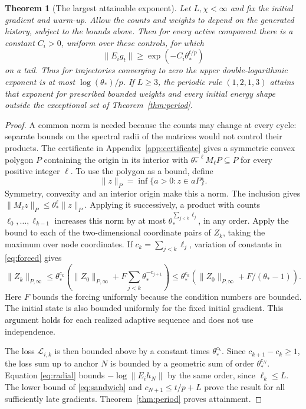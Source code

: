 \documentclass[11pt,a4paper]{article}
\newtheorem{theorem}{Theorem}
\numberwithin{equation}{section}
\newcommand{\norm}[1]{\lVert#1\rVert}
\begin{document}
\begin{theorem}[The largest attainable exponent]\label{thm:ceiling}
Let \(L,\chi<\infty\) and fix the initial gradient and warm-up. Allow the counts and weights to depend on the generated history, subject to the bounds above. Then for every active component there is a constant \(C_i>0\), uniform over these controls, for which
\[
 \norm{E_i g_t}\ge \exp(-C_i\theta_*^{t/p})
\]
on a tail. Thus for trajectories converging to zero the upper double-logarithmic exponent is at most \(\log(\theta_*)/p\). If \(L\ge3\), the periodic rule \((1,2,1,3)\) attains that exponent for prescribed bounded weights and every initial energy shape outside the exceptional set of Theorem~\ref{thm:period}.
\end{theorem}

\begin{proof}
A common norm is needed because the counts may change at every
cycle: separate bounds on the spectral radii of the matrices would
not control their products. The certificate in
Appendix~\ref{app:certificate} gives a symmetric convex polygon \(P\) containing the origin in its interior with \(\theta_*^{-\ell}M_\ell P\subseteq P\) for every positive integer \(\ell\). To use the polygon as a bound, define
\[
 \norm z_P=\inf\{a>0:z\in aP\}.
\]
Symmetry, convexity and an interior origin make this a norm. The inclusion gives \(\norm{M_\ell z}_P\le\theta_*^\ell\norm z_P\). Applying it successively, a product with counts \(\ell_0,\ldots,\ell_{k-1}\) increases this norm by at most \(\theta_*^{\sum_{j<k}\ell_j}\), in any order. Apply the bound to each of the two-dimensional coordinate pairs of \(Z_k\), taking the maximum over node coordinates. If \(c_k=\sum_{j<k}\ell_j\), variation of constants in \eqref{eq:forced} gives
\[
 \norm{Z_k}_{P,\infty}
 \le \theta_*^{c_k}\!\left(\norm{Z_0}_{P,\infty}
               + F\sum_{j<k}\theta_*^{-c_{j+1}}\right)
 \le \theta_*^{c_k}\!\left(\norm{Z_0}_{P,\infty}+F/(\theta_*-1)\right).
\]
Here \(F\) bounds the forcing uniformly because the condition numbers are bounded. The initial state is also bounded uniformly for the fixed initial gradient. This argument holds for each realized adaptive sequence and does not use independence.

The loss \(\mathcal L_{i,k}\) is then bounded above by a constant times \(\theta_*^{c_k}\). Since \(c_{k+1}-c_k\ge1\), the loss sum up to anchor \(N\) is bounded by a geometric sum of order \(\theta_*^{c_N}\). Equation \eqref{eq:radial} bounds \(-\log\norm{E_i h_N}\) by the same order, since \(\ell_k\le L\). The lower bound of \eqref{eq:sandwich} and \(c_{N+1}\le t/p+L\) prove the result for all sufficiently late gradients. Theorem~\ref{thm:period} proves attainment.
\end{proof}
\end{document}
